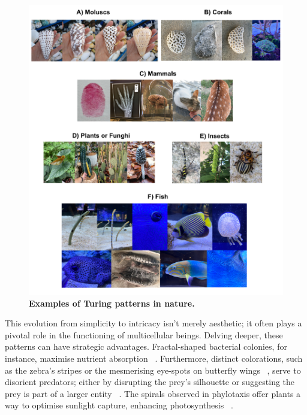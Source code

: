 \begin{figure}[h!]
    \centering
    \includegraphics[width=1\textwidth]{chapters/Introduction/pattern_examples}
    \caption[\textbf{Examples of Turing patterns in nature.} ]{\textbf{Examples of Turing patterns in nature.}}
    \label{fig:pattern_examples}
\end{figure}
This evolution from simplicity to intricacy isn't merely aesthetic; it often plays a pivotal role in the functioning of multicellular beings.
Delving deeper, these patterns can have strategic advantages.
Fractal-shaped bacterial colonies, for instance, maximise nutrient absorption ~\parencite{Matsushita1990}.
Furthermore, distinct colorations, such as the zebra's stripes or the mesmerising eye-spots on butterfly wings ~\parencite{Blest}, serve to disorient predators; either by disrupting the prey's silhouette or suggesting the prey is part of a larger entity ~\parencite{Stevens2006}.
The spirals observed in phylotaxis offer plants a way to optimise sunlight capture, enhancing photosynthesis ~\parencite{Strauss2020}.

